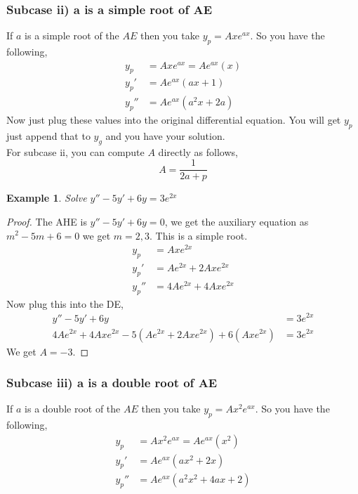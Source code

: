\documentclass[oneside,11pt,pdftex,final]{book}%
\numberwithin{equation}{section}
\newtheorem{example}[theorem]{Example}
\numberwithin{section}{chapter}
\numberwithin{equation}{chapter}
\begin{document}
\subsubsection{Subcase ii) a is a simple root of AE}
If $ a $ is a simple root of the $ AE $ then you take $ y_p=Axe^{ax} $. So you have the following,
\begin{align*}
	y_p&=Axe^{ax}=Ae^{ax}(x)\\
	y_p'&=Ae^{ax}(ax+1)\\
	y_p''&=Ae^{ax}(a^2x+2a)
\end{align*}
Now just plug these values into the original differential equation. You will get $ y_p $ just append that to $ y_g $ and you have your solution.\\

For subcase ii, you can compute $ A $ directly as follows, \[ A=\frac{1}{2a+p} \]

\begin{example}
	Solve $ y''- 5y'+6y=3e^{2x}$
\end{example}
\begin{proof}
	The AHE is $ y''-5y'+6y=0 $, we get the auxiliary equation as $ m^2-5m+6=0 $ we get $ m=2,3$. This is a simple root.
	 \begin{align*}
		y_p&=Axe^{2x}\\
		y_p'&=Ae^{2x}+2Axe^{2x}\\
		y_p''&=4Ae^{2x}+4Axe^{2x}
	\end{align*}
Now plug this into the DE,
\begin{align*}
	y''- 5y'+6y&=3e^{2x}\\
	4Ae^{2x}+4Axe^{2x}-5(Ae^{2x}+2Axe^{2x})+6(Axe^{2x})&=3e^{2x}
\end{align*}
We get $ A=-3 $.
\end{proof}
\subsubsection{Subcase iii) a is a double root of AE}
If $ a $ is a double root of the $ AE $ then you take $ y_p=Ax^2e^{ax} $. So you have the following,
\begin{align*}
	y_p&=Ax^2e^{ax}=Ae^{ax}(x^2)\\
	y_p'&=Ae^{ax} (ax^2+2x)\\
	y_p''&=Ae^{ax}(a^2x^2+4ax+2)
\end{align*}
\end{document}
